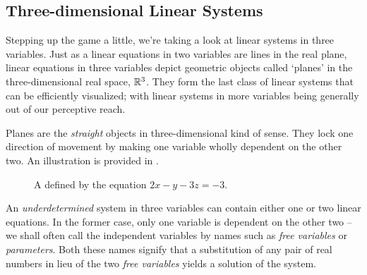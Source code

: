\subsection{Three-dimensional Linear Systems}
\label{ssec:three-dimensional-linear-systems}

Stepping up the game a little, we're taking a look at linear systems in three
variables. Just as a linear equations in two variables are lines in the real
plane, linear equations in three variables depict geometric objects called
`planes' in the three-dimensional real space, $\mathbb{R}^3$. They form the last class
of linear systems that can be efficiently visualized; with linear systems in
more variables being generally out of our perceptive reach.

Planes are the \emph{straight} objects in three-dimensional kind of sense. They
lock one direction of movement by making one variable wholly dependent on the
other two. An illustration is provided in .

\begin{figure}[ht]
 \centering

 \caption{A  defined by the equation $2x - y - 3z = -3$.}
 \label{fig:plane}
\end{figure}

An \emph{underdetermined} system in three variables can contain either one or
two linear equations. In the former case, only one variable is dependent on the
other two -- we shall often call the independent variables by names such as
\emph{free variables} or \emph{parameters}. Both these names signify that a
substitution of any pair of real numbers in lieu of the two \emph{free
variables} yields a solution of the system.

